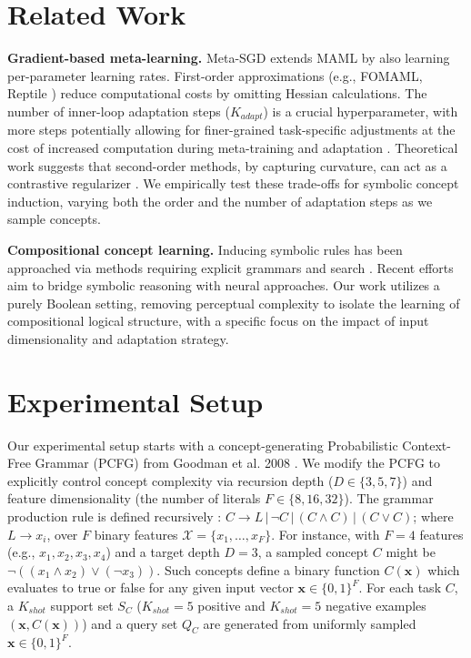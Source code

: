 \documentclass{article}
\begin{document}
\section{Related Work}\label{sec:related}
\textbf{Gradient-based meta-learning.} Meta-SGD \citep{Li2017metasgd} extends MAML by also learning per-parameter learning rates. First-order approximations (e.g., FOMAML, Reptile \citep{Nichol2018firstorder}) reduce computational costs by omitting Hessian calculations. The number of inner-loop adaptation steps ($K_{adapt}$) is a crucial hyperparameter, with more steps potentially allowing for finer-grained task-specific adjustments at the cost of increased computation during meta-training and adaptation \citep{Finn2017maml}. Theoretical work suggests that second-order methods, by capturing curvature, can act as a contrastive regularizer \citep{Kao2022contrastive}. We empirically test these trade-offs for symbolic concept induction, varying both the order and the number of adaptation steps as we sample concepts.

\textbf{Compositional concept learning.} Inducing symbolic rules has been approached via methods requiring explicit grammars and search \citep{Goodman2008lot, Lake2015bpl}. Recent efforts aim to bridge symbolic reasoning with neural approaches. Our work utilizes a purely Boolean setting, removing perceptual complexity to isolate the learning of compositional logical structure, with a specific focus on the impact of input dimensionality and adaptation strategy.

\section{Experimental Setup}\label{sec:methods}
Our experimental setup starts with a concept-generating Probabilistic Context-Free Grammar (PCFG) from Goodman et al. 2008 \citep{Goodman2008lot}. We modify the PCFG to explicitly control concept complexity via recursion depth ($D \in \{3, 5, 7\}$) and feature dimensionality (the number of literals $F \in \{8, 16, 32\}$). The grammar production rule is defined recursively : $C \to L \,|\, \neg C \,|\, (C \wedge C) \,|\, (C \vee C)$; where $L \to x_i$, over $F$ binary features $\mathcal{X}=\{x_1,\dots,x_F\}$. For instance, with $F=4$ features (e.g., $x_1, x_2, x_3, x_4$) and a target depth $D=3$, a sampled concept $C$ might be $\neg ((x_1 \wedge x_2) \vee (\neg x_3))$. Such concepts define a binary function $C(\mathbf{x})$ which evaluates to true or false for any given input vector $\mathbf{x} \in \{0,1\}^F$. For each task $C$, a $K_{shot}$ support set $S_C$ ($K_{shot}=5$ positive and $K_{shot}=5$ negative examples $(\mathbf{x}, C(\mathbf{x}))$) and a query set $Q_C$ are generated from uniformly sampled $\mathbf{x} \in \{0,1\}^F$.
\end{document}
